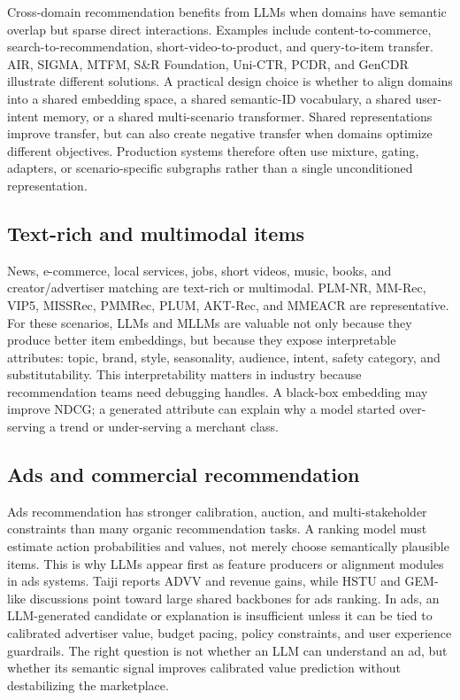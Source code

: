 \documentclass[11pt]{article}
\begin{document}
Cross-domain recommendation benefits from LLMs when domains have semantic overlap but sparse direct interactions. Examples include content-to-commerce, search-to-recommendation, short-video-to-product, and query-to-item transfer. AIR, SIGMA, MTFM, S\&R Foundation, Uni-CTR, PCDR, and GenCDR illustrate different solutions. A practical design choice is whether to align domains into a shared embedding space, a shared semantic-ID vocabulary, a shared user-intent memory, or a shared multi-scenario transformer. Shared representations improve transfer, but can also create negative transfer when domains optimize different objectives. Production systems therefore often use mixture, gating, adapters, or scenario-specific subgraphs rather than a single unconditioned representation.

\subsection{Text-rich and multimodal items}

News, e-commerce, local services, jobs, short videos, music, books, and creator/advertiser matching are text-rich or multimodal. PLM-NR, MM-Rec, VIP5, MISSRec, PMMRec, PLUM, AKT-Rec, and MMEACR are representative. For these scenarios, LLMs and MLLMs are valuable not only because they produce better item embeddings, but because they expose interpretable attributes: topic, brand, style, seasonality, audience, intent, safety category, and substitutability. This interpretability matters in industry because recommendation teams need debugging handles. A black-box embedding may improve NDCG; a generated attribute can explain why a model started over-serving a trend or under-serving a merchant class.

\subsection{Ads and commercial recommendation}

Ads recommendation has stronger calibration, auction, and multi-stakeholder constraints than many organic recommendation tasks. A ranking model must estimate action probabilities and values, not merely choose semantically plausible items. This is why LLMs appear first as feature producers or alignment modules in ads systems. Taiji reports ADVV and revenue gains, while HSTU and GEM-like discussions point toward large shared backbones for ads ranking. In ads, an LLM-generated candidate or explanation is insufficient unless it can be tied to calibrated advertiser value, budget pacing, policy constraints, and user experience guardrails. The right question is not whether an LLM can understand an ad, but whether its semantic signal improves calibrated value prediction without destabilizing the marketplace.
\end{document}
